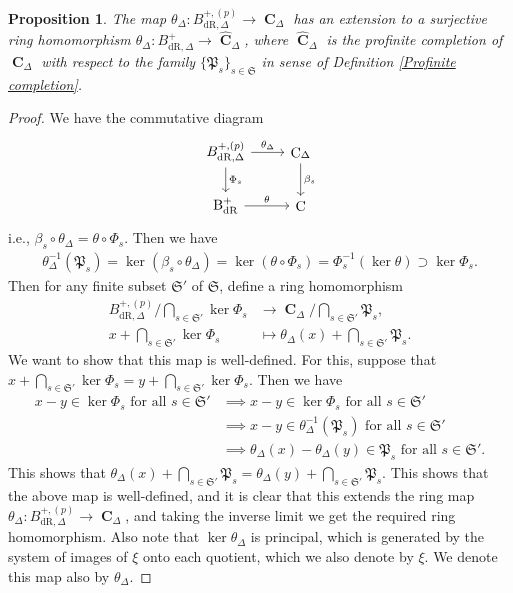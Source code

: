 \documentclass[10pt,a4paper]{amsart}
\newtheorem{proposition}{Proposition}
\DeclareMathOperator{\Bdrp}{B^+_{dR}}
\DeclareMathOperator{\C}{\textbf{C}}
\newcommand{\mBdrp}{B^+_{\mathrm{dR},\Delta}}
\newcommand{\pmBdrp}{B^{+,(p)}_{\mathrm{dR},\Delta}}
\begin{document}
\begin{proposition}
    The map $\theta_\Delta:\pmBdrp\to\C_\Delta$ has an extension to a surjective ring homomorphism $\theta_\Delta:\mBdrp\to\widehat{\C}_\Delta$, where $\widehat{\C}_\Delta$ is the profinite completion of $\C_\Delta$ with respect to the family $\{\mathfrak{P}_s\}_{s\in\mathfrak{S}}$ in sense of Definition \ref{Profinite completion}.
\end{proposition}

\begin{proof}
    We have the commutative diagram
    \[
    \begin{tikzcd}
        \pmBdrp\arrow[r,"\theta_\Delta"]\arrow[d,"\Phi_s"]& \C_\Delta\arrow[d,"\beta_s"]\\
        \Bdrp\arrow[r,"\theta"]  &\C
    \end{tikzcd}
    \]
    i.e., $\beta_s\circ\theta_\Delta=\theta\circ\Phi_s$. Then we have
    \begin{align*}
        \theta^{-1}_\Delta(\mathfrak{P}_s)=\ker(\beta_s\circ\theta_\Delta)=\ker(\theta\circ\Phi_s)=\Phi^{-1}_s(\ker\theta)\supset \ker\Phi_s.
    \end{align*}
    Then for any finite subset $\mathfrak{S}'$ of $\mathfrak{S}$, define a ring homomorphism
    \begin{align*}
        \pmBdrp/\bigcap\limits_{s\in\mathfrak{S}'}\ker\Phi_s&\to \C_\Delta/\bigcap\limits_{s\in\mathfrak{S}'}\mathfrak{P}_s,\\
        x+\bigcap\limits_{s\in\mathfrak{S}'}\ker\Phi_s&\mapsto \theta_\Delta(x)+\bigcap\limits_{s\in\mathfrak{S}'}\mathfrak{P}_s.
    \end{align*}
    We want to show that this map is well-defined. For this, suppose that $x+\bigcap\limits_{s\in\mathfrak{S}'}\ker\Phi_s=y+\bigcap\limits_{s\in\mathfrak{S}'}\ker\Phi_s$. Then we have
    \begin{align*}
        x-y\in\ker\Phi_s\text{ for all }s\in\mathfrak{S}'&\implies x-y\in\ker\Phi_s\text{ for all }s\in\mathfrak{S}'\\
        &\implies x-y\in\theta^{-1}_\Delta(\mathfrak{P}_s)\text{ for all }s\in\mathfrak{S}'\\
        &\implies \theta_\Delta(x)-\theta_\Delta(y)\in\mathfrak{P}_s\text{ for all }s\in\mathfrak{S'}.
    \end{align*}
    This shows that $\theta_\Delta(x)+\bigcap\limits_{s\in\mathfrak{S}'}\mathfrak{P}_s=\theta_\Delta(y)+\bigcap\limits_{s\in\mathfrak{S}'}\mathfrak{P}_s$. This shows that the above map is well-defined, and it is clear that this extends the ring map $\theta_\Delta:\pmBdrp\to\C_\Delta$, and taking the inverse limit we get the required ring homomorphism. Also note that $\ker\theta_\Delta$ is principal, which is generated by the system of images of $\xi$ onto each quotient, which we also denote by $\xi$. We denote this map also by $\theta_\Delta$.
\end{proof}
\end{document}
